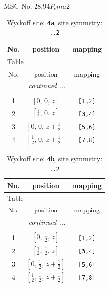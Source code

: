 \documentclass[fleqn,8pt]{jsarticle}
\begin{document}
\setcounter{MaxMatrixCols}{32}

\renewcommand{\tablename}{Table~}
\renewcommand{\figurename}{Figure~}
\begin{center}
\LARGE
MSG No. 28.94\quad$P_{c}ma2$
\end{center}
\renewcommand{\arraystretch}{1.2}
\begin{longtable}{ccc}
\caption{Wyckoff site: {\tt 4a}, site symmetry: {\tt ..2}}
 \\
 \hline \hline
No. & position & mapping \\ \hline \endfirsthead

\multicolumn{2}{l}{\tablename\ \thetable{}} \\
 \hline \hline
No. & position & mapping \\ \hline \endhead

 \hline \hline
\multicolumn{2}{r}{\footnotesize\it continued ...} \\ \endfoot

 \hline \hline
\multicolumn{2}{r}{} \\ \endlastfoot

1 & $\left[ 0,\, 0,\, z \right]$ & {\tt [1,2]} \\ \hline
2 & $\left[ \frac{1}{2},\, 0,\, z \right]$ & {\tt [3,4]} \\ \hline
3 & $\left[ 0,\, 0,\, z + \frac{1}{2} \right]$ & {\tt [5,6]} \\ \hline
4 & $\left[ \frac{1}{2},\, 0,\, z + \frac{1}{2} \right]$ & {\tt [7,8]} \\
\end{longtable}
\renewcommand{\arraystretch}{1.2}
\begin{longtable}{ccc}
\caption{Wyckoff site: {\tt 4b}, site symmetry: {\tt ..2}}
 \\
 \hline \hline
No. & position & mapping \\ \hline \endfirsthead

\multicolumn{2}{l}{\tablename\ \thetable{}} \\
 \hline \hline
No. & position & mapping \\ \hline \endhead

 \hline \hline
\multicolumn{2}{r}{\footnotesize\it continued ...} \\ \endfoot

 \hline \hline
\multicolumn{2}{r}{} \\ \endlastfoot

1 & $\left[ 0,\, \frac{1}{2},\, z \right]$ & {\tt [1,2]} \\ \hline
2 & $\left[ \frac{1}{2},\, \frac{1}{2},\, z \right]$ & {\tt [3,4]} \\ \hline
3 & $\left[ 0,\, \frac{1}{2},\, z + \frac{1}{2} \right]$ & {\tt [5,6]} \\ \hline
4 & $\left[ \frac{1}{2},\, \frac{1}{2},\, z + \frac{1}{2} \right]$ & {\tt [7,8]} \\
\end{longtable}
\end{document}
